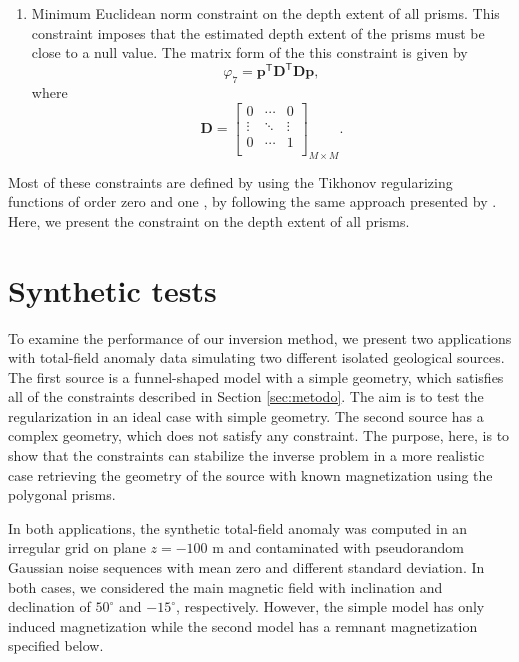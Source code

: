 \documentclass[extra,mreferee]{gji}
\begin{document}
\begin{enumerate}
\item Minimum Euclidean norm constraint on the depth extent of all prisms. This constraint imposes that the estimated depth extent of the prisms must be close to a null value. The matrix form of the this constraint is given by
\begin{equation}\label{eq:phi7}
\varphi_7 = \mathbf{p}^\mathsf{T}\mathbf{D}^\mathsf{T}\mathbf{D}\mathbf{p},
\end{equation}
where
\begin{equation}
\mathbf{D} =
\begin{bmatrix}
 0 & \cdots  & 0 \\
 \vdots & \ddots & \vdots\\
 0  & \cdots  & 1\\
\end{bmatrix}_{M\times M}.
\end{equation}

\end{enumerate}

Most of these constraints are defined by using the Tikhonov regularizing functions of order zero and one \citep{Aster2005}, by following the same approach presented by \cite{OliveiraJrVanderleiC.2011Sgeu}. Here, we present the constraint on the depth extent of all prisms.

\section{Synthetic tests}

To examine the performance of our inversion method, we present two applications with total-field anomaly data simulating two different isolated geological sources. The first source is a funnel-shaped model with a simple geometry, which satisfies all of the constraints described in Section \ref{sec:metodo}. The aim is to test the regularization in an ideal case with simple geometry. The second source has a complex geometry, which does not satisfy any constraint. The purpose, here, is to show that the constraints can stabilize the inverse problem in a more realistic case retrieving the geometry of the source with known magnetization using the polygonal prisms.

In both applications, the synthetic total-field anomaly was computed in an irregular grid on plane $z=-100$ m and contaminated with pseudorandom Gaussian noise sequences with mean zero and different standard deviation. In both cases, we considered the main magnetic field with inclination and declination of $50^\circ$ and $-15^\circ$, respectively. However, the simple model has only induced magnetization while the second model has a remnant magnetization specified below.
\end{document}
